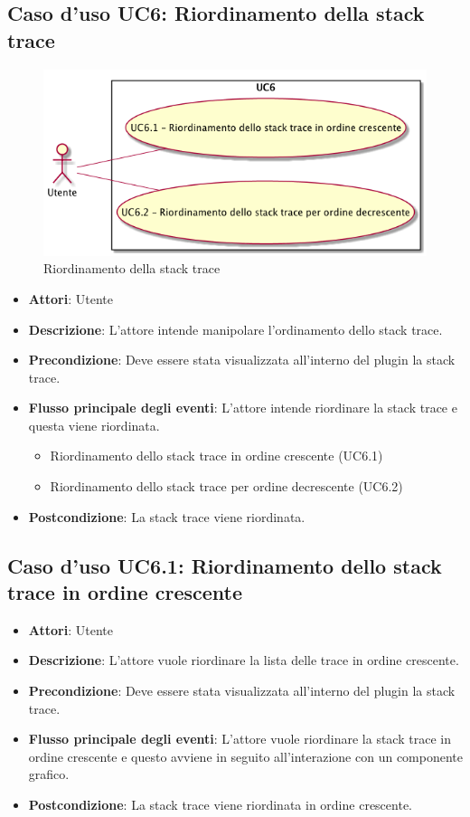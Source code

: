 \subsection{Caso d'uso UC6: Riordinamento della stack trace}
\begin{figure} [H]
	\centering
	\includegraphics[scale=0.45]{./UC/UC6.png}
	\caption{Riordinamento della stack trace}\label{}
\end{figure}
\begin{itemize}
	\item \textbf{Attori}: Utente
	\item \textbf{Descrizione}: L'attore intende manipolare l'ordinamento dello stack trace.
	\item \textbf{Precondizione}: Deve essere stata visualizzata all'interno del plugin la stack trace.
	\item \textbf{Flusso principale degli eventi}: L'attore intende riordinare la stack trace e questa viene riordinata.
	
	\begin{itemize}
		\item Riordinamento dello stack trace in ordine crescente (UC6.1)
		\item Riordinamento dello stack trace per ordine decrescente (UC6.2)
	\end{itemize}
	\item \textbf{Postcondizione}: La stack trace viene riordinata.
\end{itemize}
\subsection{Caso d'uso UC6.1: Riordinamento dello stack trace in ordine crescente}
\begin{itemize}
	\item \textbf{Attori}: Utente
	\item \textbf{Descrizione}: L'attore vuole riordinare la lista delle trace in ordine crescente.
	\item \textbf{Precondizione}: Deve essere stata visualizzata all'interno del plugin la stack trace.
	\item \textbf{Flusso principale degli eventi}: L'attore vuole riordinare la stack trace in ordine crescente e questo avviene in seguito all'interazione con un componente grafico.
	\item \textbf{Postcondizione}: La stack trace viene riordinata in ordine crescente.
\end{itemize}
